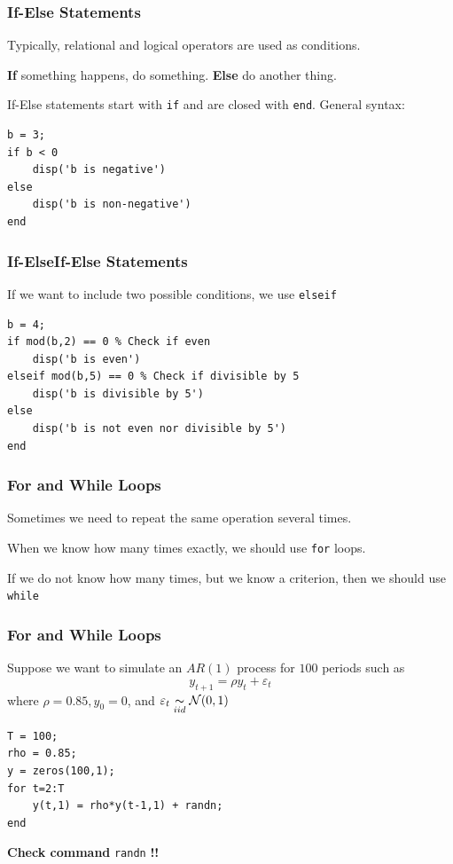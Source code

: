 \documentclass[11pt,xcolor={svgnames},aspectratio=169,usepdftitle=false]{beamer}
\let\toneitemize\itemize
\let\ttwoitemize\enditemize
\renewenvironment{itemize}{\toneitemize\addtolength{\itemsep}{1.35\baselineskip}}{\ttwoitemize}
\begin{document}
\begin{frame}[fragile]
    \frametitle{If-Else Statements}
    \begin{itemize}
        \item Typically, relational and logical operators are used as conditions.
        \item \alert{\textbf{If}} something happens, do something. \alert{\textbf{Else}} do another thing.
        \item If-Else statements start with \verb;if; and are closed with \verb;end;. General syntax:
    \end{itemize}
\begin{lstlisting}
b = 3;
if b < 0
    disp('b is negative')
else
    disp('b is non-negative')
end
\end{lstlisting}
\end{frame}

\begin{frame}[fragile]
    \frametitle{If-ElseIf-Else Statements}
\begin{itemize}
    \item If we want to include two possible conditions, we use \verb;elseif;
\end{itemize}
\begin{lstlisting}
b = 4;
if mod(b,2) == 0 % Check if even
    disp('b is even')
elseif mod(b,5) == 0 % Check if divisible by 5
    disp('b is divisible by 5')
else
    disp('b is not even nor divisible by 5')
end
\end{lstlisting}
\end{frame}

\begin{frame}[fragile]
    \frametitle{For and While Loops}
\begin{itemize}
    \item Sometimes we need to repeat the same operation several times.
    \item When we know how many times exactly, we should use \verb;for; loops.
    \item If we do not know how many times, but we know a criterion, then we should use \verb;while;
\end{itemize}
\end{frame}

\begin{frame}[fragile]
    \frametitle{For and While Loops}
Suppose we want to simulate an $AR(1)$ process for $100$ periods such as
\[
y_{t+1} = \rho y_t + \varepsilon_t
\]
where $\rho = 0.85,y_0 = 0$, and $\varepsilon_t \underset{iid}{\thicksim} \mathcal{N}(0,1)$

\begin{lstlisting}
T = 100;
rho = 0.85;
y = zeros(100,1);
for t=2:T
    y(t,1) = rho*y(t-1,1) + randn;
end
\end{lstlisting}
\alert{\textbf{Check command}} \verb;randn; \alert{\textbf{!!}}
\end{frame}
\end{document}
